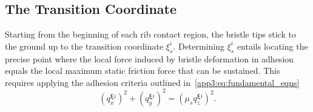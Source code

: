 

\subsection{The Transition Coordinate}

Starting from the beginning of each rib contact region, the bristle tips stick to the ground up to the transition coordinate $\xi_s^i$. Determining $\xi_s^i$ entails locating the precise point where the local force induced by bristle deformation in adhesion equals the local maximum static friction force that can be sustained. This requires applying the adhesion criteria outlined in~\eqref{app3:eq:fundamental_eqns}
%
\begin{equation}
  \left(q_{x}^{\bm{\xi}i}\right)^{2} + \left(q_{y}^{\bm{\xi}i}\right)^{2} = \left(\mu_s q_{z}^{\bm{\xi}i}\right)^{2}.
  \label{app3:eq:transition}
\end{equation}

